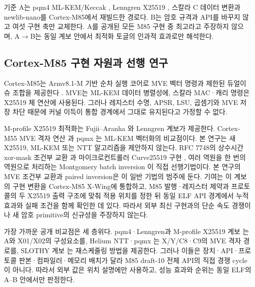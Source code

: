\documentclass[runningheads,orivec]{llncs}
\newcommand{\xwing}{X-Wing}\newcommand{\slothy}{SLOTHY}\newcommand{\keccak}{Keccak-f[1600]}
\begin{document}
기준 A는 pqm4 ML-KEM/Keccak \cite{pqm4}, Lenngren X25519 \cite{Lenngren},
스칼라 C 데이터 변환과 newlib-nano를 Cortex-M85에서 재빌드한 경로다. B는 암호
규격과 API를 바꾸지 않고 여섯 구현 축만 교체한다. A를 공개된 모든 M85 구현 중
최고라고 주장하지 않으며, A$\to$B는 동일 계보 안에서 최적화 토글의 인과적 효과로만
해석한다.

\subsection{Cortex-M85 구현 자원과 선행 연구}

Cortex-M85는 Armv8.1-M 기반 순차 실행 코어로 MVE 벡터 명령과 제한된 듀얼이슈
조합을 제공한다 \cite{ArmM85Opt}. MVE는 ML-KEM 데이터 병렬성에, 스칼라
MAC·캐리 명령은 X25519 체 연산에 사용된다. 그러나 레지스터 수명, APSR, LSU,
곱셈기와 MVE 저장 차단 때문에 커널 이득이 통합 경계에서 그대로 유지된다고 가정할
수 없다.

M-profile X25519 최적화는 Fujii--Aranha \cite{FujiiAranha17}와 Lenngren 계보가
제공한다. Cortex-M55
MVE 격자 연산 \cite{HeliumNTT22}과 pqmx \cite{pqmx}는 ML-KEM 벡터화의 비교점이다.
본 연구는 새 X25519, ML-KEM 또는 NTT 알고리즘을 제안하지 않는다. RFC 7748의
상수시간 xor-mask 조건부 교환 \cite{RFC7748}과 마이크로컨트롤러 Curve25519 구현
\cite{DullEtAl15}, 여러 역원을 한 번의 역원으로 처리하는 Montgomery batch inversion
\cite{GuideECC04}이 직접 선행기법이다. 본 연구의 MVE 조건부 교환과 paired inversion은
이 일반 기법의 범주에 둔다. 기여는 이
계보의 구현 변환을 Cortex-M85 \xwing{}에 통합하고, M85 발행·레지스터 제약과 프로토콜의
두 X25519 출력 구조에 맞춰 적용 위치를 정한 뒤 동일 ELF API 경계에서 누적 효과와
실패 조건을 함께 확인한 데 있다. 따라서 외부 최신 구현과의 단순 속도 경쟁이나 새
암호 primitive의 신규성을 주장하지 않는다.

가장 가까운 공개 비교점은 세 층위다. pqm4·Lenngren과 M-profile X25519 계보
\cite{pqm4,Lenngren,FujiiAranha17}는 A와 X01/X02의 구성요소를,
Helium NTT·pqmx \cite{HeliumNTT22,pqmx}는 X/Y/C8·C9의 MVE 격자 경로를,
\slothy{} 계보 \cite{Slothy22,SlothyM7_25}는 재스케줄링 방법을 제공한다. 그러나 이들은
장치·API·프로토콜 판본·컴파일러·메모리 배치가 달라 M85 draft-10 전체 API의 직접
경쟁 cycle이 아니다. 따라서 외부 값은 위치 설명에만 사용하고, 성능 효과와 순위는
동일 ELF의 A--B 안에서만 판정한다.
\end{document}
